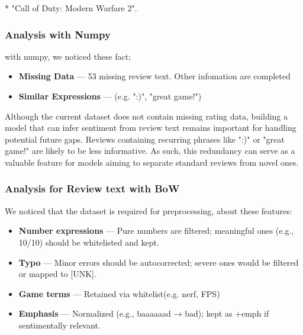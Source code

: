 \documentclass[a4paper,twocolumn,11pt]{article}
\begin{document}
\begin{table}[htbp]
  \centering
  \caption{title}
  \label{tab:hogehoge}
  \begin{threeparttable}
    \begin{tablenotes}
      \tiny
      \item[*] "Call of Duty: Modern Warfare 2".
    \end{tablenotes}
  \end{threeparttable}
\end{table}


\subsubsection{Analysis with Numpy}
with numpy, we noticed these fact;

\begin{itemize}
    \item \textbf{Missing Data} — 53 missing review text. Other infomation are completed
    \item \textbf{Similar Expressions} — (e.g. ":)", "great game!")
\end{itemize}
Although the current dataset does not contain missing rating data, building a model that can infer sentiment from review text remains important for handling potential future gaps.
Reviews containing recurring phrases like ":)" or "great game!" are likely to be less informative. As such, this redundancy can serve as a valuable feature for models aiming to separate standard reviews from novel ones.
\subsubsection{Analysis for Review text with BoW}
We noticed that the dataset is required for preprocessing, about these features:

\begin{itemize}
  \item \textbf{Number expressions} — Pure numbers are filtered; meaningful ones (e.g., 10/10) should be whitelisted and kept.
  \item \textbf{Typo} — Minor errors should be autocorrected; severe ones would be filtered or mapped to [UNK].
  \item \textbf{Game terms} — Retained via whitelist(e.g. nerf, FPS)
  \item \textbf{Emphasis} — Normalized (e.g., baaaaaad → bad); kept as +emph if sentimentally relevant.
\end{itemize}
\end{document}
